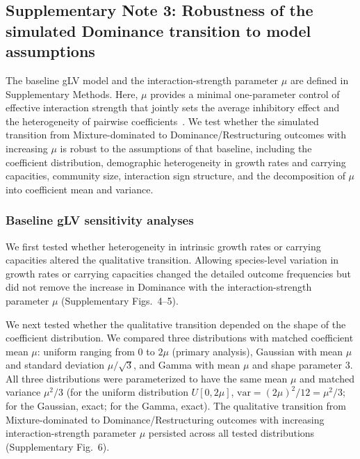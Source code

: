 \subsection*{Supplementary Note 3: Robustness of the simulated Dominance transition to model assumptions}
\label{sec:suppl:note3}

The baseline gLV model and the interaction-strength parameter $\mu$ are defined in Supplementary Methods. Here, $\mu$ provides a minimal one-parameter control of effective interaction strength that jointly sets the average inhibitory effect and the heterogeneity of pairwise coefficients~\citep{Hu2022,Marsland2019,Ratzke2020,Hu2025,Allesina2012,Grilli2017}. We test whether the simulated transition from Mixture-dominated to Dominance/Restructuring outcomes with increasing $\mu$ is robust to the assumptions of that baseline, including the coefficient distribution, demographic heterogeneity in growth rates and carrying capacities, community size, interaction sign structure, and the decomposition of $\mu$ into coefficient mean and variance.

\subsubsection*{Baseline gLV sensitivity analyses}

We first tested whether heterogeneity in intrinsic growth rates or carrying capacities altered the qualitative transition. Allowing species-level variation in growth rates or carrying capacities changed the detailed outcome frequencies but did not remove the increase in Dominance with the interaction-strength parameter $\mu$ (Supplementary Figs.~4--5).

We next tested whether the qualitative transition depended on the shape of the coefficient distribution. We compared three distributions with matched coefficient mean $\mu$: uniform ranging from 0 to $2\mu$ (primary analysis), Gaussian with mean $\mu$ and standard deviation $\mu/\sqrt{3}$, and Gamma with mean $\mu$ and shape parameter 3. All three distributions were parameterized to have the same mean $\mu$ and matched variance $\mu^2/3$ (for the uniform distribution $U[0,2\mu]$, $\text{var} = (2\mu)^2/12 = \mu^2/3$; for the Gaussian, exact; for the Gamma, exact). The qualitative transition from Mixture-dominated to Dominance/Restructuring outcomes with increasing interaction-strength parameter $\mu$ persisted across all tested distributions (Supplementary Fig.~6).

